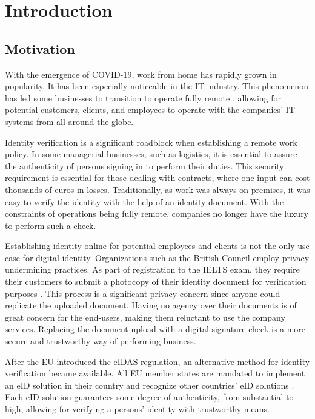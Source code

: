 \section{Introduction}

\subsection{Motivation}

With the emergence of COVID-19, work from home has rapidly grown in popularity. It has been especially noticeable in the IT industry. This phenomenon has led some businesses to transition to operate fully remote \cite{ozimek2020future}, allowing for potential customers, clients, and employees to operate with the companies' IT systems from all around the globe.

Identity verification is a significant roadblock when establishing a remote work policy. In some managerial businesses, such as logistics, it is essential to assure the authenticity of persons signing in to perform their duties. This security requirement is essential for those dealing with contracts, where one input can cost thousands of euros in losses. Traditionally, as work was always on-premises, it was easy to verify the identity with the help of an identity document. With the constraints of operations being fully remote, companies no longer have the luxury to perform such a check.

Establishing identity online for potential employees and clients is not the only use case for digital identity. Organizations such as the British Council employ privacy undermining practices. As part of registration to the IELTS exam, they require their customers to submit a photocopy of their identity document for verification purposes \cite{ielts-howtoregister}. This process is a significant privacy concern since anyone could replicate the uploaded document. Having no agency over their documents is of great concern for the end-users, making them reluctant to use the company services. Replacing the document upload with a digital signature check is a more secure and trustworthy way of performing business.

After the EU introduced the eIDAS regulation, an alternative method for identity verification became available. All EU member states are mandated to implement an eID solution in their country and recognize other countries' eID solutions \cite{eulaw-eidas}. Each eID solution guarantees some degree of authenticity, from substantial to high, allowing for verifying a persons' identity with trustworthy means.

